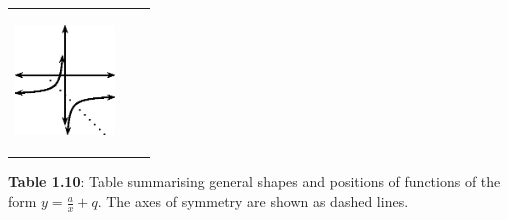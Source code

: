 \begin{center}
\begin{xtabular*}{\mytablewidth}[t]{|p{10\mystarwidth}|p{10\mystarwidth}|p{10\mystarwidth}|}
    
        
                  
    \setcounter{subfigure}{0}

\label{m39341*id246993}
    \begin{center}
    \label{m39341*id246993!!!underscore!!!media}\label{m39341*id246993!!!underscore!!!printimage}\includegraphics[width=100px]{col11306.imgs/m39341_MG10C11_025.png} %
        
      \vspace{2pt}
    \vspace{.1in}
    
    \end{center}



    \addtocounter{footnote}{-0}
    
     \tabularnewline{}
    \end{xtabular*}
      \end{center}
    \begin{center}{\small\bfseries Table 1.10}: Table summarising general shapes and positions of functions of the form \begin{math}y=\frac{a}{x}+q\end{math}. The axes of symmetry are shown as dashed lines.\end{center}
    
    \addtocounter{footnote}{-0}
    
    \par
{}  
        \label{m39341*uid152}
            \nopagebreak
            
